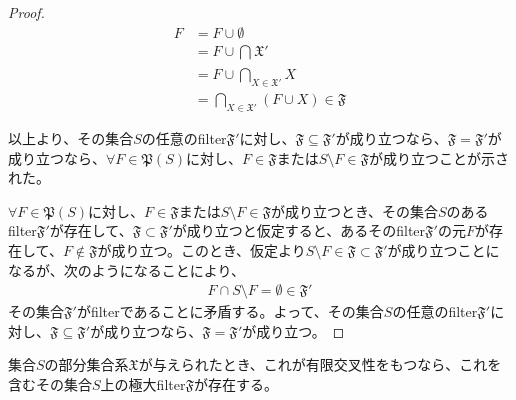 \documentclass[dvipdfmx]{jsarticle}
\begin{document}
\begin{proof}
\begin{align*}
F &= F \cup \emptyset\\
&= F \cup \bigcap_{} \mathfrak{X}'\\
&= F \cup \bigcap_{X \in \mathfrak{X}'} X\\
&= \bigcap_{X \in \mathfrak{X}'} (F \cup X)\in \mathfrak{F}
\end{align*}\par
以上より、その集合$S$の任意のfilter$\mathfrak{F}'$に対し、$\mathfrak{F \subseteq}\mathfrak{F}'$が成り立つなら、$\mathfrak{F} = \mathfrak{F}'$が成り立つなら、$\forall F \in \mathfrak{P}(S)$に対し、$F \in \mathfrak{F}$または$S \setminus F \in \mathfrak{F}$が成り立つことが示された。\par
$\forall F \in \mathfrak{P}(S)$に対し、$F \in \mathfrak{F}$または$S \setminus F \in \mathfrak{F}$が成り立つとき、その集合$S$のあるfilter$\mathfrak{F}'$が存在して、$\mathfrak{F \subset}\mathfrak{F}'$が成り立つと仮定すると、あるそのfilter$\mathfrak{F}'$の元$F$が存在して、$F \notin \mathfrak{F}$が成り立つ。このとき、仮定より$S \setminus F \in \mathfrak{F \subset}\mathfrak{F}'$が成り立つことになるが、次のようになることにより、
\begin{align*}
F \cap S \setminus F = \emptyset \in \mathfrak{F}'
\end{align*}
その集合$\mathfrak{F}'$がfilterであることに矛盾する。よって、その集合$S$の任意のfilter$\mathfrak{F}'$に対し、$\mathfrak{F \subseteq}\mathfrak{F}'$が成り立つなら、$\mathfrak{F} = \mathfrak{F}'$が成り立つ。
\end{proof}
\begin{thm}\label{8.1.8.6}
集合$S$の部分集合系$\mathfrak{X}$が与えられたとき、これが有限交叉性をもつなら、これを含むその集合$S$上の極大filter$\mathfrak{F}$が存在する。
\end{thm}
\end{document}
